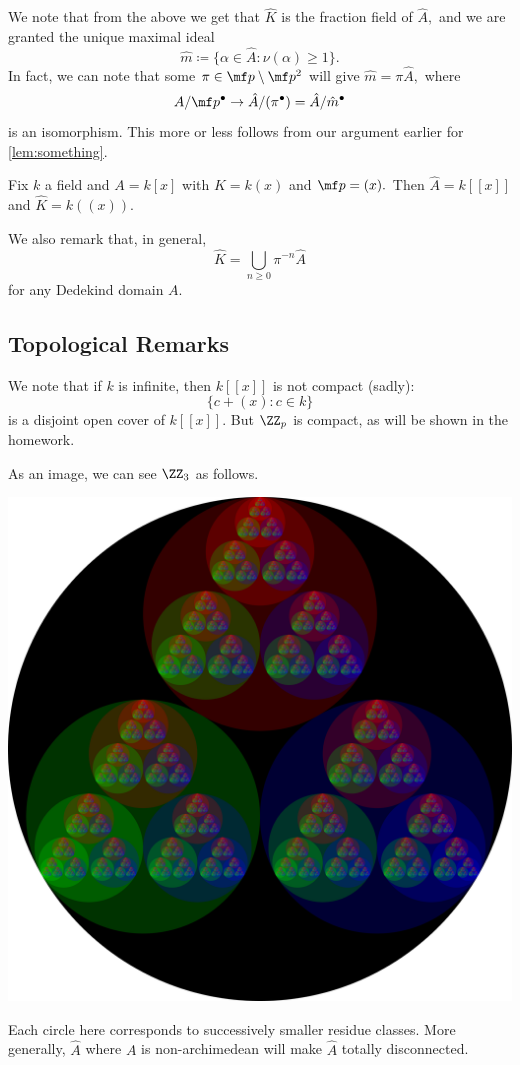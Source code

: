 \documentclass[../notes.tex]{subfiles}
\begin{document}
We note that from the above we get that $\hat K$ is the fraction field of $\hat A,$ and we are granted the unique maximal ideal
\[\hat m\coloneqq \{\alpha\in\hat A:\nu(\alpha)\ge1\}.\]
In fact, we can note that some $\pi\in\mf p\setminus\mf p^2$ will give $\hat m=\pi\hat A,$ where
\[A/\mf p^\bullet\to\hat A/(\pi^\bullet)=\hat A/\hat m^\bullet\]
is an isomorphism. This more or less follows from our argument earlier for \autoref{lem:something}. 
\begin{example}
	Fix $k$ a field and $A=k[x]$ with $K=k(x)$ and $\mf p=(x).$ Then $\hat A=k[[x]]$ and $\hat K=k((x)).$
\end{example}
We also remark that, in general,
\[\hat K=\bigcup_{n\ge 0}\pi^{-n}\hat A\]
for any Dedekind domain $A.$

\subsection{Topological Remarks}
We note that if $k$ is infinite, then $k[[x]]$ is not compact (sadly):
\[\{c+(x):c\in k\}\]
is a disjoint open cover of $k[[x]].$ But $\ZZ_p$ is compact, as will be shown in the homework.

As an image, we can see $\ZZ_3$ as follows.
\begin{center}
	\includegraphics[scale=0.1]{./3-adics-dark.png}
\end{center}
Each circle here corresponds to successively smaller residue classes. More generally, $\hat A$ where $A$ is non-archimedean will make $\hat A$ totally disconnected.
\end{document}
